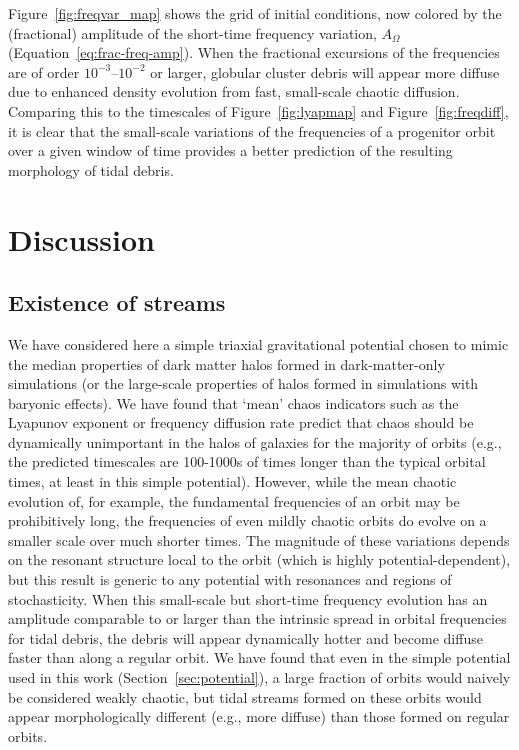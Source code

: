\documentclass[letterpaper,12pt,preprint]{aastex}
\begin{document}
Figure~\ref{fig:freqvar_map} shows the grid of initial conditions, now colored by the (fractional) amplitude of the short-time frequency variation, $A_\Omega$ (Equation~\ref{eq:frac-freq-amp}). When the fractional excursions of the frequencies are of order $10^{-3}$--$10^{-2}$ or larger, globular cluster debris will appear more diffuse due to enhanced density evolution from fast, small-scale chaotic diffusion. Comparing this to the timescales of Figure~\ref{fig:lyapmap} and Figure~\ref{fig:freqdiff}, it is clear that the small-scale variations of the frequencies of a progenitor orbit over a given window of time provides a better prediction of the resulting morphology of tidal debris. 

\section{Discussion}\label{sec:discussion}

\subsection{Existence of streams}

We have considered here a simple triaxial gravitational potential chosen to mimic the median properties of dark matter halos formed in dark-matter-only simulations (or the large-scale properties of halos formed in simulations with baryonic effects). We have found that `mean' chaos indicators such as the Lyapunov exponent or frequency diffusion rate predict that chaos should be dynamically unimportant in the halos of galaxies for the majority of orbits (e.g., the predicted timescales are 100-1000s of times longer than the typical orbital times, at least in this simple potential). However, while the mean chaotic evolution of, for example, the fundamental frequencies of an orbit may be prohibitively long, the frequencies of even mildly chaotic orbits do evolve on a smaller scale over much shorter times. The magnitude of these variations depends on the resonant structure local to the orbit (which is highly potential-dependent), but this result is generic to any potential with resonances and regions of stochasticity. When this small-scale but short-time frequency evolution has an amplitude comparable to or larger than the intrinsic spread in orbital frequencies for tidal debris, the debris will appear dynamically hotter and become diffuse faster than along a regular orbit. We have found that even in the simple potential used in this work (Section~\ref{sec:potential}), a large fraction of orbits would naively be considered weakly chaotic, but tidal streams formed on these orbits would appear morphologically different (e.g., more diffuse) than those formed on regular orbits. 
\end{document}
